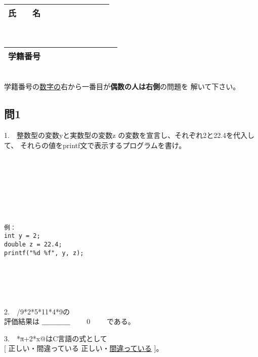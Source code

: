 \documentclass[a4j]{jarticle}
\def\ans#1#2{
\ifnum \anss=1
#1
\else
#2
\fi
}
\begin{document}
\begin{multicols*}{2}
\vspace*{3cm}

\vfill

\mbox{}





\noindent
\begin{tabular}[t]{|c|cccccccc|}\hline
氏　　名 & & & & & & & & \\ \hline
\end{tabular}\\
\begin{tabular}[t]{|c|c|c|c|c|c|c|c|c|c|}\hline
学籍番号 & & & & & & & & \\ \hline
\end{tabular}\\
学籍番号の\underline{数字の}右から一番目が{\bfseries 偶数の人は右側}の問題を
解いて下さい。
\vspace{-5ex}





\subsection*{問1}


1.　整数型の変数{\ttfamily y}と実数型の変数{\ttfamily z}
の変数を宣言し、それぞれ{\ttfamily 2と22.4}を代入して、
それらの値を{\ttfamily printf}文で表示するプログラムを書け。

\ifnum {}
\begin{verbatim}








\end{verbatim}
\else
\begin{verbatim}
例：
int y = 2;
double z = 22.4;
printf("%d %f", y, z);






\end{verbatim}
\fi



2.　{/9*2*5*11*4*9}の\\
\hfill 評価結果は\ans{＿＿＿＿}{　　0　　}である。



3.　*π+2*x@はC言語の式として\\
\hfill[\ans{正しい・間違っている}{正しい・\underline{間違っている}}]。



\end{multicols*}
\end{document}
